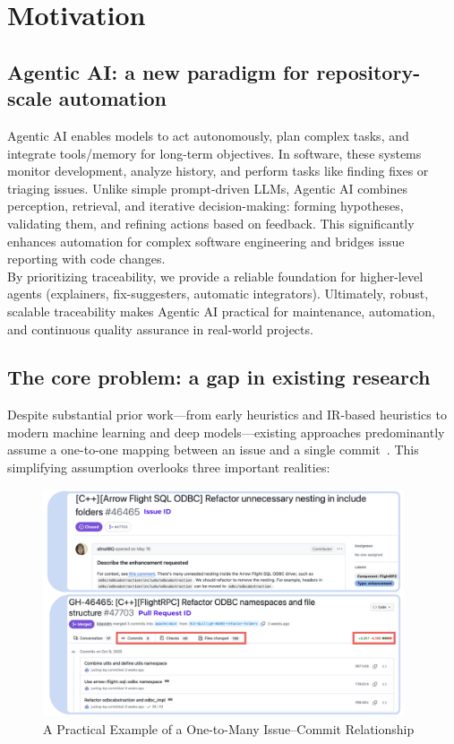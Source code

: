 
\section{Motivation}

\subsection{Agentic AI: a new paradigm for repository-scale automation}
Agentic AI enables models to act autonomously, plan complex tasks, and integrate tools/memory for long-term objectives. In software, these systems monitor development, analyze history, and perform tasks like finding fixes or triaging issues. Unlike simple prompt-driven LLMs, Agentic AI combines perception, retrieval, and iterative decision-making: forming hypotheses, validating them, and refining actions based on feedback. This significantly enhances automation for complex software engineering and bridges issue reporting with code changes.\\

\noindent
By prioritizing traceability, we provide a reliable foundation for higher-level agents (explainers, fix-suggesters, automatic integrators). Ultimately, robust, scalable traceability makes Agentic AI practical for maintenance, automation, and continuous quality assurance in real-world projects.


\subsection{The core problem: a gap in existing research}

Despite substantial prior work—from early heuristics and IR-based heuristics to modern machine learning and deep models—existing approaches predominantly assume a one-to-one mapping between an issue and a single commit~\cite{r17,r19,r20,r7}. This simplifying assumption overlooks three important realities:

    \begin{figure}[H]
        \centering
        \includegraphics[width=0.95\textwidth]{Figures/issue-pr-demo-example.png}
        \caption{A Practical Example of a One-to-Many Issue--Commit Relationship}
        \label{fig:issue_pr_demo_example}
    \end{figure}

